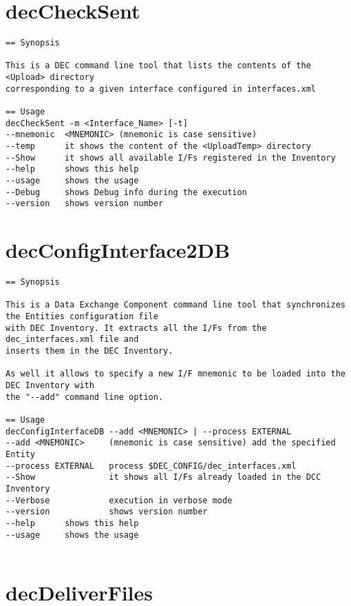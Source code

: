 \documentclass[dec_sum_main.tex]{subfiles}
\begin{document}
\section{decCheckSent} \label{decCheckSent}

\begin{verbatim}
== Synopsis

This is a DEC command line tool that lists the contents of the <Upload> directory
corresponding to a given interface configured in interfaces.xml

== Usage
decCheckSent -m <Interface_Name> [-t]
--mnemonic  <MNEMONIC> (mnemonic is case sensitive)
--temp      it shows the content of the <UploadTemp> directory
--Show      it shows all available I/Fs registered in the Inventory
--help      shows this help
--usage     shows the usage
--Debug     shows Debug info during the execution
--version   shows version number

\end{verbatim}

\label{decConfigInterface2DB}
\section{decConfigInterface2DB}

\begin{verbatim}
== Synopsis

This is a Data Exchange Component command line tool that synchronizes the Entities configuration file
with DEC Inventory. It extracts all the I/Fs from the dec_interfaces.xml file and 
inserts them in the DEC Inventory.

As well it allows to specify a new I/F mnemonic to be loaded into the DEC Inventory with 
the "--add" command line option.

== Usage
decConfigInterfaceDB --add <MNEMONIC> | --process EXTERNAL
--add <MNEMONIC>     (mnemonic is case sensitive) add the specified Entity  
--process EXTERNAL   process $DEC_CONFIG/dec_interfaces.xml
--Show               it shows all I/Fs already loaded in the DCC Inventory
--Verbose            execution in verbose mode
--version            shows version number
--help      shows this help
--usage     shows the usage


\end{verbatim}

\section{decDeliverFiles}
\end{document}
